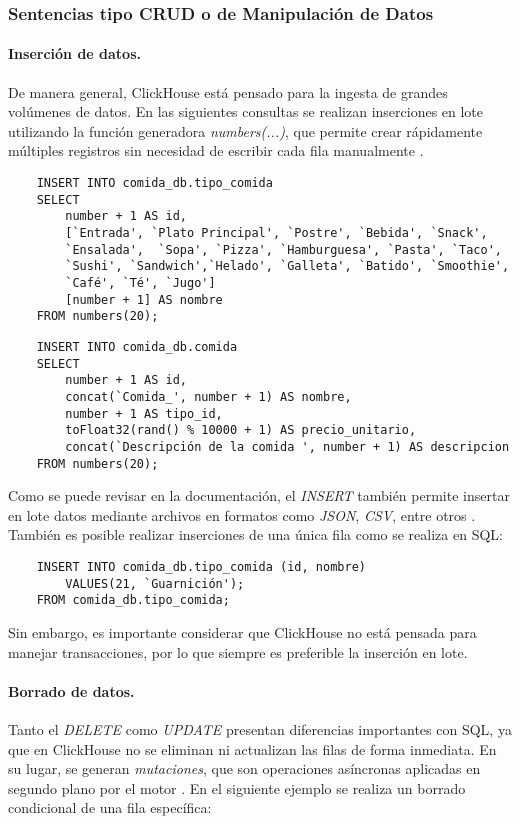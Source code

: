 \subsubsection{Sentencias tipo CRUD o de Manipulación de Datos} 
\paragraph{Inserción de datos.}
De manera general, ClickHouse está pensado para la ingesta de grandes volúmenes de datos. En las siguientes consultas se realizan inserciones en lote utilizando la función generadora \emph{numbers(...)}, que permite crear rápidamente múltiples registros sin necesidad de escribir cada fila manualmente \parencite{clickhouse_sql_reference}. 

\begin{verbatim}
    INSERT INTO comida_db.tipo_comida
    SELECT
        number + 1 AS id,
        [`Entrada', `Plato Principal', `Postre', `Bebida', `Snack',
        `Ensalada',  `Sopa', `Pizza', `Hamburguesa', `Pasta', `Taco', 
        `Sushi', `Sandwich',`Helado', `Galleta', `Batido', `Smoothie', 
        `Café', `Té', `Jugo']
        [number + 1] AS nombre
    FROM numbers(20);
\end{verbatim}

\begin{verbatim}
    INSERT INTO comida_db.comida
    SELECT
        number + 1 AS id,
        concat(`Comida_', number + 1) AS nombre,
        number + 1 AS tipo_id,
        toFloat32(rand() % 10000 + 1) AS precio_unitario,
        concat(`Descripción de la comida ', number + 1) AS descripcion
    FROM numbers(20);
\end{verbatim}
Como se puede revisar en la documentación, el \emph{INSERT} también permite insertar en lote datos mediante archivos en formatos como \emph{JSON}, \emph{CSV}, entre otros \parencite{clickhouse_sql_reference}. También es posible realizar inserciones de una única fila como se realiza en SQL:
\begin{verbatim}
    INSERT INTO comida_db.tipo_comida (id, nombre)
        VALUES(21, `Guarnición');
    FROM comida_db.tipo_comida;
\end{verbatim}
Sin embargo, es importante considerar que ClickHouse no está pensada para manejar transacciones, por lo que siempre es preferible la inserción en lote.   


\paragraph{Borrado de datos.}
Tanto el \emph{DELETE} como \emph{UPDATE} presentan diferencias importantes con SQL, ya que en ClickHouse no se eliminan ni actualizan las filas de forma inmediata. En su lugar, se generan \emph{mutaciones}, que son operaciones asíncronas aplicadas en segundo plano
por el motor \parencite{clickhouse_sql_reference}. En el siguiente ejemplo se realiza un borrado condicional de una fila específica:



